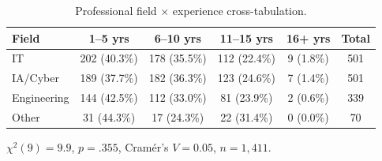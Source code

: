 \begin{table}[ht]
\centering
\caption{Professional field $\times$ experience cross-tabulation.}
\label{tab:field_exp_xtab}
\small
\begin{tabular}{lccccc}
\toprule
Field & 1--5 yrs & 6--10 yrs & 11--15 yrs & 16+ yrs & Total \\
\midrule
IT & 202 (40.3\%) & 178 (35.5\%) & 112 (22.4\%) & 9 (1.8\%) & 501 \\
IA/Cyber & 189 (37.7\%) & 182 (36.3\%) & 123 (24.6\%) & 7 (1.4\%) & 501 \\
Engineering & 144 (42.5\%) & 112 (33.0\%) & 81 (23.9\%) & 2 (0.6\%) & 339 \\
Other & 31 (44.3\%) & 17 (24.3\%) & 22 (31.4\%) & 0 (0.0\%) & 70 \\
\bottomrule
\end{tabular}

\smallskip
\footnotesize $\chi^2(9)=9.9$, $p=.355$, Cram\'er's $V=0.05$, $n=1{,}411$.
\end{table}

